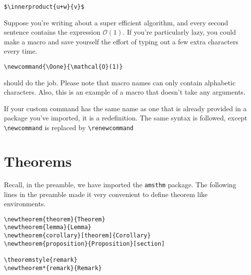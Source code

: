 \documentclass[12pt, letterpaper]{article}
\theoremstyle{remark}
\newcommand{\innerproduct}[2]{\langle \boldsymbol{ #1 } , \boldsymbol{ #2 } \rangle}
\begin{document}
\begin{lstlisting}
$\innerproduct{u+w}{v}$
\end{lstlisting}

Suppose you're writing about a super efficient algorithm, and every second sentence contains the expression $\mathcal{O}(1)$. If you're particularly lazy, you could make a macro and save yourself the effort of typing out a few extra characters every time.
\begin{lstlisting}
\newcommand{\Oone}{\mathcal{O}(1)}
\end{lstlisting}
should do the job. Please note that macro names can only contain alphabetic characters. \cite{macros} Also, this is an example of a macro that doesn't take any arguments.

If your custom command has the same name as one that is already provided in a package you've imported, it is a redefinition. The same syntax is followed, except \verb!\newcommand! is replaced by \verb!\renewcommand!

\section{Theorems}
Recall, in the preamble, we have imported the \verb!amsthm! package. The following lines in the preamble made it very convenient to define theorem like environments.
\begin{lstlisting}
\newtheorem{theorem}{Theorem}
\newtheorem{lemma}{Lemma}
\newtheorem{corollary}[theorem]{Corollary}
\newtheorem{proposition}{Proposition}[section]

\theoremstyle{remark}
\newtheorem*{remark}{Remark}
\end{lstlisting}
\end{document}
